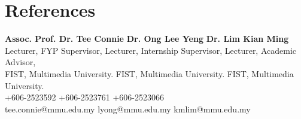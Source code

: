 \documentclass[a4,10pt]{article}
\begin{document}
 \section{References}
 \begin{itemize}[leftmargin=0.15in, label={}]
    \small{\item{
     \textbf{Assoc. Prof. Dr. Tee Connie}  \hspace{1.2cm} \textbf{Dr. Ong Lee Yeng} \hspace{2.7cm} \textbf{Dr. Lim Kian Ming}\\
     {Lecturer, FYP Supervisor, } \hspace{2.05cm} {Lecturer, Internship Supervisor, }\hspace{1.2cm} {Lecturer, Academic Advisor, }\\
    {FIST, Multimedia University.} \hspace{1.65cm} {FIST, Multimedia University.} \hspace{1.45cm} {FIST, Multimedia University.} \\
     {+606-2523592}\hspace{4.01cm} {+606-2523761}\hspace{3.85cm} {+606-2523066} \\
     {tee.connie@mmu.edu.my} \hspace{2.4cm}  {lyong@mmu.edu.my}\hspace{3.05cm}  {kmlim@mmu.edu.my}
    }}
    
 \end{itemize}
 

 



\end{document}
